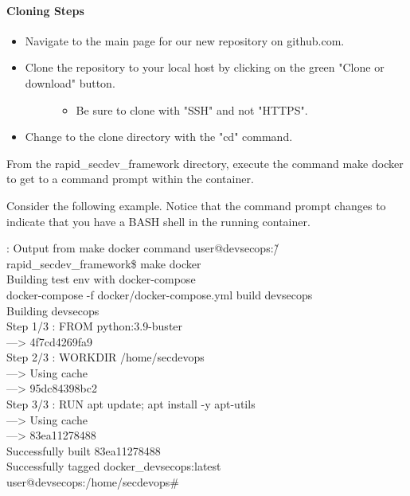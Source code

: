 \paragraph{Cloning Steps}

\begin{itemize}
      \item
            Navigate to the main page for our new repository on github.com.
      \item
            \begin{description}
                  \item[Clone the repository to your local host by clicking on the green
                        "Clone or download" button.]
                        \begin{itemize}

                              \item
                                    Be sure to clone with "SSH" and not "HTTPS".
                        \end{itemize}
            \end{description}
      \item
            Change to the clone directory with the "cd" command.
\end{itemize}

From the rapid\_secdev\_framework directory, execute the command
make docker to get to a command prompt within the container.

Consider the following example. Notice that the command prompt changes
to indicate that you have a BASH shell in the running container.

\begin{mybox}{\thetcbcounter: Output from make docker command}
      user@devsecops:\~/rapid\_secdev\_framework\$ make docker\\
      Building test env with docker-compose\\
      docker-compose -f docker/docker-compose.yml build devsecops\\
      Building devsecops\\
      Step 1/3 : FROM python:3.9-buster\\
      ---> 4f7cd4269fa9\\
      Step 2/3 : WORKDIR /home/secdevops\\
      ---> Using cache\\
      ---> 95dc84398bc2\\
      Step 3/3 : RUN apt update; apt install -y apt-utils\\
      ---> Using cache\\
      ---> 83ea11278488\\
      Successfully built 83ea11278488\\
      Successfully tagged docker\_devsecops:latest\\
      user@devsecops:/home/secdevops\#
\end{mybox}


